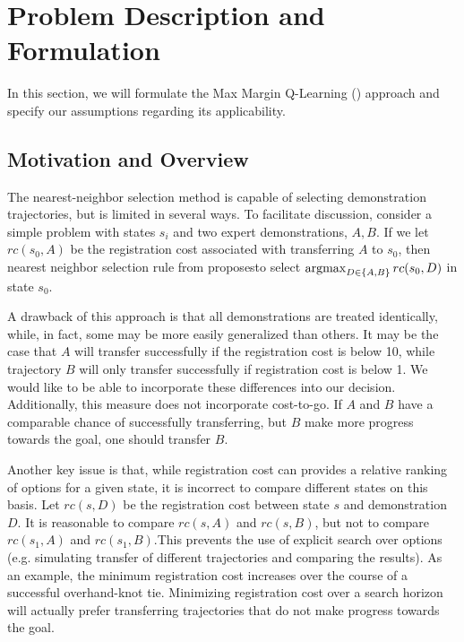 \section{Problem Description and Formulation}
\label{sec:formulation}
%

In this section, we will formulate the Max Margin Q-Learning (\mmql{}) approach and
specify our assumptions regarding its applicability.

\subsection{Motivation and Overview}
The nearest-neighbor selection method is capable of selecting demonstration trajectories, 
but is limited in several ways. To facilitate discussion, consider a simple problem with 
states $s_i$ and two expert demonstrations, $A, B$. If we let $rc(s_0, A)$ be the registration
cost associated with transferring $A$ to $s_0$, then nearest neighbor selection rule from 
\citet{Schulmanetal_ISRR2013} proposesto select $\operatorname*{argmax}_{D \in \{A, B\}} rc(s_0, D)$ in 
state $s_0$.

A drawback of this approach is that all demonstrations are treated 
identically, while, in fact, some may be more easily generalized than others. 
It may be the case that $A$ will transfer successfully if the registration cost is 
below 10, while trajectory $B$ will only transfer successfully if registration cost 
is below 1. We would like to be able to incorporate these differences into our decision. 
Additionally, this measure does not incorporate cost-to-go. If $A$ and $B$ have a
comparable chance of successfully transferring, but $B$ make more progress towards the goal,
one should transfer $B$.

Another key issue is that, while registration cost can provides a relative 
ranking of options for a given state, it is incorrect to compare different states on this 
basis. Let $rc(s, D)$ be the registration cost between state $s$ and demonstration 
$D$. It is reasonable to compare $rc(s, A)$ and $rc(s, B)$, but not to compare $rc(s_1, A)$ 
and $rc(s_1, B)$.This prevents the use of explicit search over options (e.g. simulating 
transfer of different trajectories and comparing the results). As an example, the minimum 
registration cost increases over the course of a successful overhand-knot tie. Minimizing 
registration cost over a search horizon will actually prefer transferring trajectories that 
do not make progress towards the goal.

